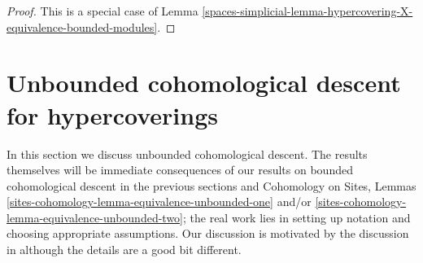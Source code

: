 \begin{proof}
This is a special case of
Lemma \ref{spaces-simplicial-lemma-hypercovering-X-equivalence-bounded-modules}.
\end{proof}

\section{Unbounded cohomological descent for hypercoverings}
\label{spaces-simplicial-section-unbounded-cohomological-descent}
In this section we discuss unbounded cohomological descent.
The results themselves will be immediate consequences of
our results on bounded cohomological descent in the previous
sections and Cohomology on Sites, Lemmas
\ref{sites-cohomology-lemma-equivalence-unbounded-one} and/or
\ref{sites-cohomology-lemma-equivalence-unbounded-two}; the real work lies
in setting up notation and choosing appropriate assumptions.
Our discussion is motivated by the discussion in \cite{six-I}
although the details are a good bit different.

